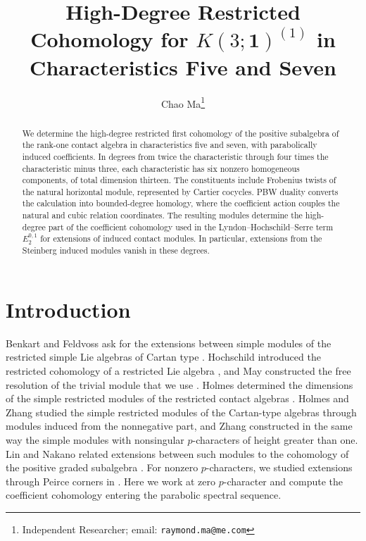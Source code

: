 \documentclass[11pt]{article}
\title{High-Degree Restricted Cohomology for $K(3;\mathbf1)^{(1)}$ in Characteristics Five and Seven}
\author{Chao Ma\thanks{Independent Researcher; email: \texttt{raymond.ma@me.com}}}
\date{}
\theoremstyle{plain}
\theoremstyle{definition}
\theoremstyle{remark}
\numberwithin{equation}{section}
\begin{document}
\maketitle

\begin{abstract}
We determine the high-degree restricted first cohomology of the positive
subalgebra of the rank-one contact algebra in characteristics five and seven,
with parabolically induced coefficients. In degrees from twice the
characteristic through four times the characteristic minus three, each
characteristic has six nonzero homogeneous components, of total dimension thirteen.
The constituents include Frobenius twists of the natural horizontal module,
represented by Cartier cocycles. PBW duality converts the calculation into
bounded-degree homology, where the coefficient action couples the natural
and cubic relation coordinates. The resulting modules determine the
high-degree part of the coefficient cohomology used in the
Lyndon--Hochschild--Serre term $E_2^{0,1}$ for extensions of induced contact modules.
In particular, extensions from the Steinberg induced modules vanish in these degrees.
\end{abstract}

\section{Introduction}

Benkart and Feldvoss ask for the extensions between simple modules of the
restricted simple Lie algebras of Cartan type \cite[Problem~4]{BenkartFeldvoss}.
Hochschild introduced the restricted cohomology of a restricted Lie algebra
\cite{Hochschild}, and May constructed the free resolution of the trivial module
that we use \cite{May}.  Holmes determined the dimensions of the simple restricted
modules of the restricted contact algebras \cite{HolmesContact}.  Holmes and Zhang
\cite{HolmesZhang} studied the simple restricted modules of the Cartan-type algebras
through modules induced from the nonnegative part, and Zhang \cite{ZhangCartan}
constructed in the same way the simple modules with nonsingular $p$-characters of height
greater than one.  Lin and
Nakano related extensions between such modules to the cohomology of the positive graded
subalgebra \cite{LinNakano}.
For nonzero $p$-characters, we studied extensions through Peirce corners
in \cite{MaPeirce}. Here we work at zero $p$-character and compute the
coefficient cohomology entering the parabolic spectral sequence.
\end{document}
